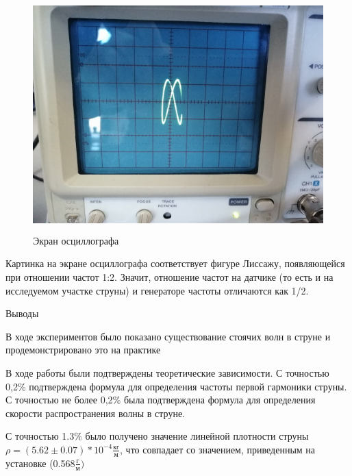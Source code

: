 \documentclass[12pt,a4paper]{article}
\begin{document}
\begin{center}
\begin{figure}[H]
\centering
\includegraphics[width=15cm, height=9cm]{1.4.5_2}
\caption{Экран осциллографа}
\label{gr:2}
\end{figure}
\end{center}
\par Картинка на экране осциллографа соответствует фигуре Лиссажу, появляющейся при отношении частот 1:2. Значит, отношение частот на датчике (то есть и на исследуемом участке струны) и генераторе частоты отличаются как 1/2.
\newpage
\begin{center}
\large Выводы
\end{center}
\par В ходе экспериментов было показано существование стоячих волн в струне и продемонстрировано это на практике
\par В ходе работы были подтверждены теоретические зависимости. С точностью 0,2\% подтверждена формула для определения частоты первой гармоники струны. С точностью не более 0,2\% была подтверждена формула для определения скорости распространения волны в струне.
\par С точностью 1.3\% было получено значение линейной плотности струны $\rho=(5.62\pm0.07)*10^{-4} \frac{\text{кг}}{\text{м}}$, что совпадает со значением, приведенным на установке (0.568$\frac{\text{г}}{\text{м}})$
\end{document}
